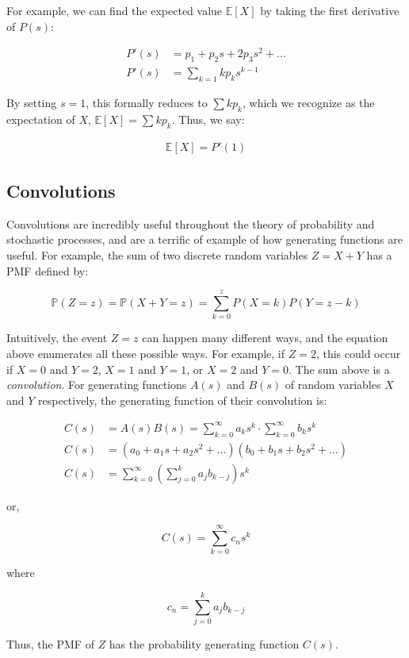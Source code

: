 \documentclass[11pt]{article}
\renewcommand{\P}{\mathbb{P}}
\newcommand{\E}{\mathbb{E}}
\begin{document}
For example, we can find the expected value $\E[X]$ by taking the first
derivative of $P(s)$:

\begin{align*}
  P'(s) &= p_1 + p_2 s + 2 p_3 s^2 + \ldots\\
  P'(s) &= \sum_{k = 1} k p_k s^{k-1}
\end{align*}

By setting $s=1$, this formally reduces to $\sum k p_k$, which we recognize as
the expectation of $X$, $\E[X] = \sum k p_k$. Thus, we say:

\begin{align*}
  \label{eq:gen-func-thm-01}
    \E[X] = P'(1) 
\end{align*}

\subsection{Convolutions}

Convolutions are incredibly useful throughout the theory of probability and
stochastic processes, and are a terrific of example of how generating functions
are useful. For example, the sum of two discrete random variables $Z = X + Y$
has a PMF defined by:

$$
\P(Z = z) = \P(X + Y = z) = \sum_{k=0}^z P(X=k) P(Y=z-k)
$$

Intuitively, the event $Z=z$ can happen many different ways, and the equation
above enumerates all these possible ways. For example, if $Z=2$, this could
occur if $X=0$ and $Y=2$, $X=1$ and $Y=1$, or $X=2$ and $Y=0$. The sum above is
a \emph{convolution}. For generating functions $A(s)$ and $B(s)$ of random
variables $X$ and $Y$ respectively, the generating function of their
convolution is:

\begin{align*}
  C(s) &= A(s)B(s) = \sum_{k=0}^\infty a_k s^k \cdot \sum_{k=0}^\infty b_k s^k \\
  C(s) &= ( a_0 + a_1 s + a_2 s^2 + \ldots ) (b_0 + b_1 s + b_2 s^2 + \ldots)\\
  C(s) &= \sum_{k=0}^\infty \left( \sum_{j=0}^k a_j b_{k-j} \right) s^k
\end{align*}

or,

$$
C(s) = \sum_{k=0}^\infty c_n s^k
$$

where

$$
c_n = \sum_{j=0}^k a_j b_{k-j}
$$

Thus, the PMF of $Z$ has the probability generating function $C(s)$.
\end{document}
